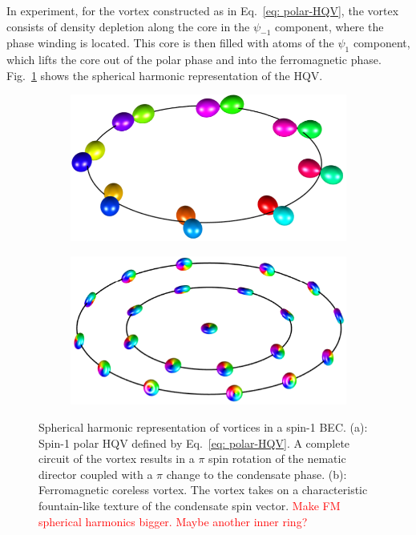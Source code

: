In experiment, for the vortex constructed as in Eq.~\eqref{eq: polar-HQV}, the
vortex consists of density depletion along the core in the \(\psi_{-1}\)
component, where the phase winding is located.
This core is then filled with atoms of the \(\psi_1 \) component, which lifts
the core out of the polar phase and into the ferromagnetic phase.
Fig.~\ref{subfig: polar-HQV} shows the spherical harmonic representation of the
HQV.\@
\begin{figure}
    \centering
    \begin{subfigure}{0.49\textwidth}
        \includegraphics[width=\textwidth]
        {gfx/ch-groundStateSymmetries/polar-HQV.pdf}
        \caption{\label{subfig: polar-HQV}}
    \end{subfigure}
    \begin{subfigure}{0.49\textwidth}
        \includegraphics[width=\textwidth]
        {gfx/ch-groundStateSymmetries/coreless.pdf}
        \caption{\label{subfig: coreless-vortex}}
    \end{subfigure}
    \caption{Spherical harmonic representation of vortices in a spin-1 BEC.\@
        (a): Spin-1 polar HQV defined by Eq.~\eqref{eq: polar-HQV}.
        A complete circuit of the vortex results in a \(\pi \) spin rotation of
        the nematic director coupled with a \(\pi \) change to the condensate phase.
        (b): Ferromagnetic coreless vortex.
        The vortex takes on a characteristic fountain-like texture of the condensate
        spin vector. \textcolor{red}{Make FM spherical harmonics
            bigger. Maybe another inner ring?}
    }
\end{figure}

